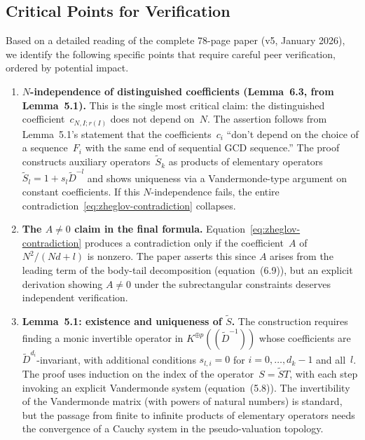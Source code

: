 \documentclass[12pt,a4paper]{article}
\theoremstyle{definition}
\begin{document}
\subsection{Critical Points for Verification}

Based on a detailed reading of the complete 78-page paper (v5,
January 2026), we identify the following specific points that require
careful peer verification, ordered by potential impact.

\begin{enumerate}[label=(\alph*)]
\item \textbf{$N$-independence of distinguished coefficients
  (Lemma~6.3, from Lemma~5.1).}
  This is the single most critical claim: the distinguished
  coefficient~$c_{N,I;r(I)}$ does not depend on~$N$.  The
  assertion follows from Lemma~5.1's statement that the
  coefficients~$c_i$ ``don't depend on the choice of a sequence~$F_i$
  with the same end of sequential GCD sequence.''  The proof constructs
  auxiliary operators~$\widetilde{S}_k$ as products of elementary
  operators $\widetilde{S}_l = 1 + s_l\widetilde{D}^{-l}$ and
  shows uniqueness via a Vandermonde-type argument on constant
  coefficients.  If this $N$-independence fails, the entire
  contradiction~\eqref{eq:zheglov-contradiction} collapses.

\item \textbf{The $A \neq 0$ claim in the final formula.}
  Equation~\eqref{eq:zheglov-contradiction} produces a contradiction
  only if the coefficient~$A$ of~$N^2/(Nd+l)$ is nonzero.  The
  paper asserts this since $A$ arises from the leading term of the
  body-tail decomposition (equation~(6.9)), but an explicit derivation
  showing $A \neq 0$ under the subrectangular constraints deserves
  independent verification.

\item \textbf{Lemma~5.1: existence and uniqueness of
  $\widetilde{S}$.}
  The construction requires finding a monic invertible operator in
  $K^{\oplus p}((\widetilde{D}^{-1}))$ whose coefficients are
  $\widetilde{D}^{d_i}$-invariant, with additional conditions
  $s_{l,i} = 0$ for $i = 0,\ldots,d_k - 1$ and all~$l$.  The
  proof uses induction on the index of the operator~$S = \widetilde{S}T$,
  with each step invoking an explicit Vandermonde system
  (equation~(5.8)).  The invertibility of the Vandermonde matrix
  (with powers of natural numbers) is standard, but the passage from
  finite to infinite products of elementary operators needs the
  convergence of a Cauchy system in the pseudo-valuation topology.


\end{enumerate}
\end{document}
